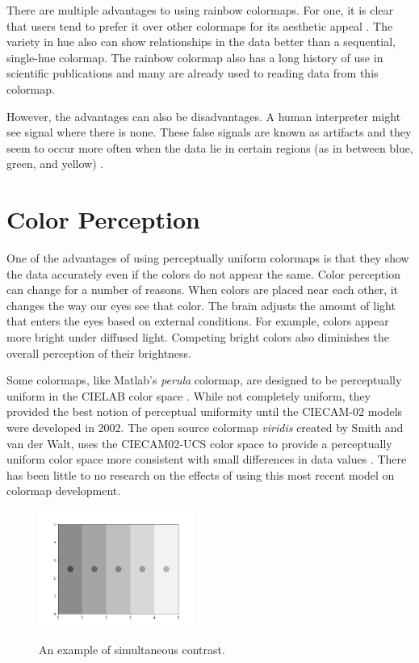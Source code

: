 \documentclass[journal,12pt]{IEEEtran}
\begin{document}
There are multiple advantages to using rainbow colormaps. For one,
it is clear that users tend to prefer it
over other colormaps for its aesthetic appeal
\cite{spectralschemes, choropleth, endofrainbow}. 
The variety in hue also can show relationships in the data better than
a sequential, single-hue colormap. The rainbow colormap also has a long
history of use in scientific publications and many are already used
to reading data from this colormap.

However, the advantages can also be disadvantages.
A human interpreter
might see signal where there is none. These false signals
are known as artifacts and they seem to occur more often
when the data lie in certain regions (as in
between blue, green, and yellow) \cite{colorchoice}.

\section{Color Perception}

One of the advantages of using perceptually uniform colormaps is
that they show the data accurately even if the colors do not appear
the same. Color perception can change for a number of reasons. When 
colors are placed near each other, it changes the way our eyes see that color.
The brain adjusts the amount of light that enters the eyes based
on external conditions. For example, colors appear more bright under diffused
light. Competing bright colors also diminishes the overall perception
of their brightness.

Some colormaps,
like Matlab's \textit{perula} colormap, are designed to be perceptually
uniform in the CIELAB color space \cite{viridis}. While not 
completely uniform, they provided the best notion of perceptual uniformity until
the CIECAM-02 models were developed in 2002.
The open source colormap \textit{viridis} created by Smith and van der Walt, uses
the CIECAM02-UCS color space to provide a perceptually uniform color space more
consistent with small differences in data values \cite{viridis}. There has been
little to no research on the effects of using this most recent model on colormap
development.

\begin{figure}
\centering
\includegraphics[width=2in]{tempcontrast} \\
\caption{An example of simultaneous contrast.}
\end{figure}
\end{document}
